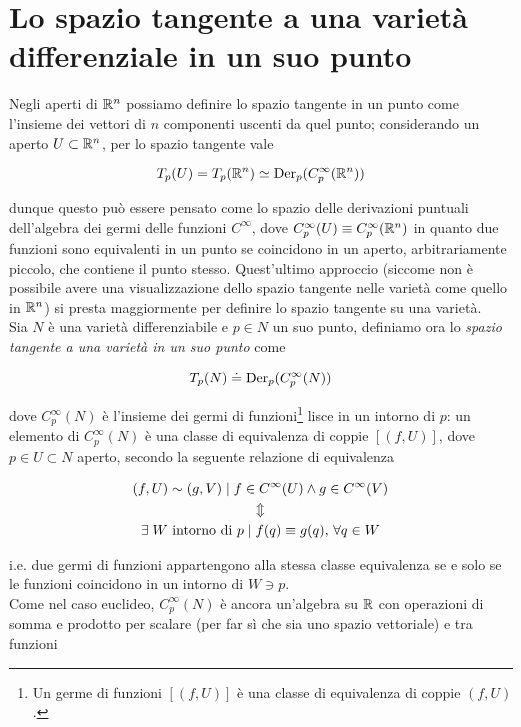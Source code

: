 \section{Lo spazio tangente a una varietà differenziale in un suo punto}

Negli aperti di $ \mathbb{R}^{n} $ possiamo definire lo spazio tangente in un punto come l'insieme dei vettori di $ n $ componenti uscenti da quel punto; considerando un aperto $ U \subset \mathbb{R}^{n} $, per lo spazio tangente vale

\begin{equation}
	T_{p}(U) = T_{p}(\mathbb{R}^{n}) \simeq \operatorname{Der}_{p}(C_{p}^{\infty}(\mathbb{R}^{n}))
\end{equation}

dunque questo può essere pensato come lo spazio delle derivazioni puntuali dell'algebra dei germi delle funzioni $ C^{\infty} $, dove $ C_{p}^{\infty}(U) \equiv C_{p}^{\infty}(\mathbb{R}^{n}) $ in quanto due funzioni sono equivalenti in un punto se coincidono in un aperto, arbitrariamente piccolo, che contiene il punto stesso. Quest'ultimo approccio (siccome non è possibile avere una visualizzazione dello spazio tangente nelle varietà come quello in $ \mathbb{R}^{n} $) si presta maggiormente per definire lo spazio tangente su una varietà.\\
Sia $ N $ è una varietà differenziabile e $ p \in N $ un suo punto, definiamo ora lo \textit{spazio tangente a una varietà in un suo punto} come

\begin{equation}
	T_{p}(N) \doteq \operatorname{Der}_{p}(C_{p}^{\infty}(N))
\end{equation}

dove $ C_{p}^{\infty}(N) $ è l'insieme dei germi di funzioni\footnote{%
	Un germe di funzioni $ [(f,U)] $ è una classe di equivalenza di coppie $ (f,U) $.%
} lisce in un intorno di $ p $: un elemento di $ C_{p}^{\infty}(N) $ è una classe di equivalenza di coppie $ [(f,U)] $, dove $ p \in U \subset N $ aperto, secondo la seguente relazione di equivalenza

\begin{gather}
	(f,U) \sim (g,V) \mid f \in C^{\infty}(U) \wedge g \in C^{\infty}(V) \nonumber\\
	\Updownarrow\\
	\exists \; W \text{ intorno di } p \mid f(q) \equiv g(q) , \, \forall q \in W \nonumber
\end{gather}

i.e. due germi di funzioni appartengono alla stessa classe equivalenza se e solo se le funzioni coincidono in un intorno di $ W \ni p $.\\
Come nel caso euclideo, $ C_{p}^{\infty}(N) $ è ancora un'algebra su $ \mathbb{R} $ con operazioni di somma e prodotto per scalare (per far sì che sia uno spazio vettoriale) e tra funzioni

